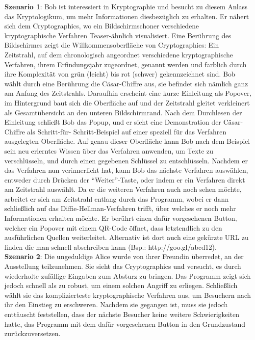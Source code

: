 \documentclass{article}
\begin{document}
\textbf{Szenario 1}:
Bob ist interessiert in Kryptographie und besucht zu diesem Anlass das \gls{Kryptologikum}, um mehr Informationen diesbezüglich zu erhalten. Er nähert sich dem \gls{Cryptographics}, wo ein Bildschirmschoner verschiedene kryptographische Verfahren Teaser-ähnlich visualisiert. Eine Berührung des Bildschirmes zeigt die Willkommensoberfläche von \gls{Cryptographics}: Ein Zeitstrahl, auf dem chronologisch angeordnet verschiedene kryptographische Verfahren, ihrem Erfindungsjahr zugeordnet, genannt werden und farblich durch ihre Komplexität von grün (leicht) bis rot (schwer) gekennzeichnet sind. Bob wählt durch eine Berührung die Cäsar-Chiffre aus, sie befindet sich nämlich ganz am Anfang des Zeitstrahls. Daraufhin erscheint eine kurze Einleitung als Popover, im Hintergrund baut sich die Oberfläche auf und der Zeitstrahl gleitet verkleinert als Gesamtübersicht an den unteren Bildschirmrand. Nach dem Durchlesen der Einleitung schließt Bob das Popup, und er sieht eine Demonstration der Cäsar-Chiffre als Schritt-für-
Schritt-Beispiel auf 
einer speziell für das Verfahren ausgelegten Oberfläche. Auf genau dieser Oberfläche kann Bob nach dem Beispiel sein neu erlerntes Wissen über das Verfahren anwenden, um Texte zu verschlüsseln, und durch einen gegebenen Schlüssel zu entschlüsseln. Nachdem er das Verfahren nun verinnerlicht hat, kann Bob das nächste Verfahren auswählen, entweder durch Drücken der “Weiter”-Taste, oder indem er ein Verfahren direkt am Zeitstrahl auswählt. Da er die weiteren Verfahren auch noch sehen möchte, arbeitet er sich am Zeitstrahl entlang durch das Programm, wobei er dann schließlich auf das Diffie-Hellman-Verfahren trifft, über welches er noch mehr Informationen erhalten möchte. Er berührt einen dafür vorgesehenen Button, welcher ein Popover mit einem QR-Code öffnet, dass letztendlich zu den ausführlichen Quellen weiterleitet. Alternativ ist dort auch eine gekürzte URL zu finden die man schnell abschreiben kann (Bsp.: http://goo.gl/abcd12).\\

\textbf{Szenario 2}:
Die ungeduldige Alice wurde von ihrer Freundin überredet, an der Ausstellung teilzunehmen. Sie sieht das \gls{Cryptographics} und versucht, es durch wiederholte zufällige Eingaben zum Absturz zu bringen. Das Programm zeigt sich jedoch schnell als zu robust, um einem solchen Angriff zu erliegen. Schließlich wählt sie das komplizierteste kryptographische Verfahren aus, um Besuchern nach ihr den Einstieg zu erschweren. Nachdem sie gegangen ist, muss sie jedoch enttäuscht feststellen, dass der nächste Besucher keine weitere Schwierigkeiten hatte, das Programm mit dem dafür vorgesehenen Button in den Grundzustand zurückzuversetzen.\\
\end{document}
